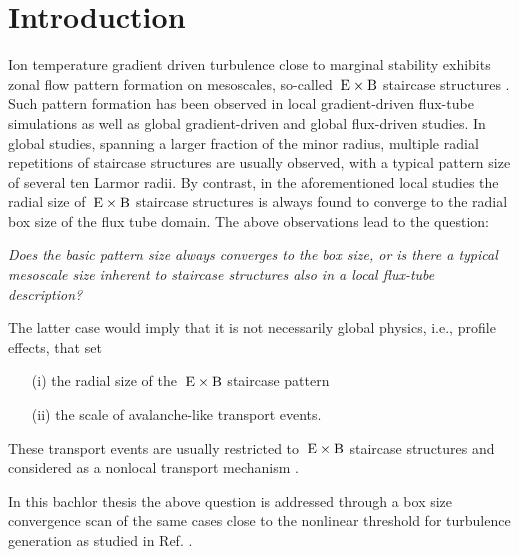 
\chapter{Introduction}
\label{chap:intro}

Ion temperature gradient driven turbulence close to marginal stability exhibits zonal flow pattern formation on mesoscales, so-called $\mathrm{\:E}\times\mathrm{B}$ staircase structures \cite{pradalier2010}.
Such pattern formation has been observed in local gradient-driven flux-tube simulations \cite{peeters2016, weikl2017, rath2021} as well as global gradient-driven \cite{mcmillan2009, villard2013, seo2022} and global flux-driven \cite{pradalier2010, pradalier2015, wang2020, kim2022, kishimoto2023} studies. 
In global studies, spanning a larger fraction of the minor radius, multiple radial repetitions of staircase structures are usually observed, with a typical pattern size of several ten Larmor radii.
By contrast, in the aforementioned local studies the radial size of $\mathrm{\:E}\times\mathrm{B}$ staircase structures is always found to converge to the radial box size of the flux tube domain.
The above observations lead to the question: \bigskip


\textit{Does the basic pattern size always converges to the box size, or is there a typical mesoscale size inherent to staircase structures also in a local flux-tube description?}\bigskip

The latter case would imply that it is not necessarily global physics, i.e., profile effects, that set 
\begin{itemize}
	\item[(i)] the radial size of the $\mathrm{\:E}\times\mathrm{B}$ staircase pattern
	\item[(ii)] the scale of avalanche-like transport events.
\end{itemize}
These transport events are usually restricted to $\mathrm{\:E}\times\mathrm{B}$ staircase structures and considered as a nonlocal transport mechanism \cite{pradalier2010}. \bigskip

In this bachlor thesis the above question is addressed through a box size convergence scan of the same cases close to the nonlinear threshold for turbulence generation as studied in Ref. .
